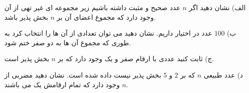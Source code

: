 \exercise
الف) نشان دهید اگر
$n$
عدد صحیح و مثبت داشته باشیم زیر مجموعه ای غیر تهی از آن وجود دارد که مجموع اعضای آن بر
$n$
بخش پذیر باشد.

ب)
$100$
عدد در اختیار داریم. نشان دهید می توان تعدادی از آن ها را انتخاب کرد به طوری که مجموع آن ها به دو صفر ختم شود.

ج) ثابت کنید عددی با ارقام صفر و یک وجود دارد که بر
$n$
بخش پذیر است.

د) عدد طبیعی
$n$
که بر
$2$
و
$5$
بخش پذیر نیست داده شده است. نشان دهید مضربی از
$n$
وجود دارد که تمام ارقامش یک می باشند.